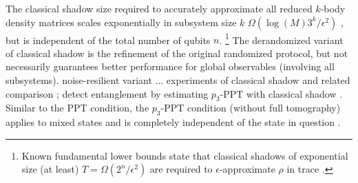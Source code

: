 \documentclass[
aps,
pra,
twocolumn,
floatfix,
]{revtex4-2}
\theoremstyle{plain}
\newtheorem{theorem}{Theorem}
\theoremstyle{definition}
\newcommand{\ob}{O}
\newcommand{\dm}{\rho}
\newcommand{\ghz}{\text{GHZ}}
\begin{document}


The classical shadow size required to accurately approximate all reduced $k$-body density matrices scales exponentially in subsystem size $k$ $\Omega(\log(M) 3^k/\epsilon^2)$ \cite{huangPredictingManyProperties2020}, but is independent of the total number of qubits $n$.
\footnote{Known fundamental lower bounds state that classical shadows of exponential size (at least) $T = \Omega( 2^n / \epsilon^2)$ are required to $\epsilon$-approximate $\dm$ in trace .}
The derandomized variant of classical shadow \cite{huangEfficientEstimationPauli2021} is the refinement of the original randomized protocol, 
but not necessarily guarantees better performance for global observables (involving all subsystems).  
noise-resilient variant \cite{chenRobustShadowEstimation2021} ...
experiments of classical shadow and related comparison \cite{zhangExperimentalQuantumState2021};
detect entanglement by estimating $p_3$-PPT with classical shadow \cite{elbenMixedstateEntanglementLocal2020}.
Similar to the PPT condition, the $p_3$-PPT condition (without full tomography) applies to mixed states and is completely independent of the state in question \cite{elbenMixedstateEntanglementLocal2020}. 
\end{document}
